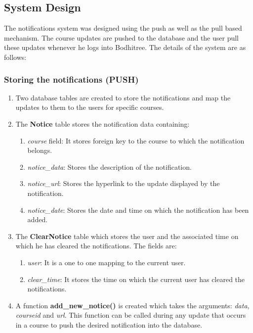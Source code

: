 \subsection{System Design}

\hspace{0.35cm} The notifications system was designed using the push as well as the pull based mechanism. The course updates are pushed to the database and the user pull these updates whenever he logs into Bodhitree. The details of the system are as follows: 

\subsubsection*{Storing the notifications (PUSH)}

\begin{enumerate}
	\item Two database tables are created to store the notifications and map the updates to them to the users for specific courses.
	\item The \textbf{Notice} table stores the notification data containing:
	\begin{enumerate}
		\item \textit{course} field: It stores foreign key to the course to which the notification belongs.
		\item \textit{notice\_data}: Stores the description of the notification.
		\item \textit{notice\_url}: Stores the hyperlink to the update displayed by the notification.
		\item \textit{notice\_date}: Stores the date and time on which the notification has been added. 
	\end{enumerate}
	\item The \textbf{ClearNotice} table which stores the user and the associated time on which he has cleared the notifications. The fields are:
	\begin{enumerate}
		\item \textit{user}: It is a one to one mapping to the current user.
		\item \textit{clear\_time}: It stores the time on which the current user has cleared the notifications.
	\end{enumerate}
	\item A function \textbf{add\_new\_notice()} is created which takes the arguments: \textit{data, courseid} and \textit{url}. This function can be called during any update that occurs in a course to push the desired notification into the database.
\end{enumerate}

